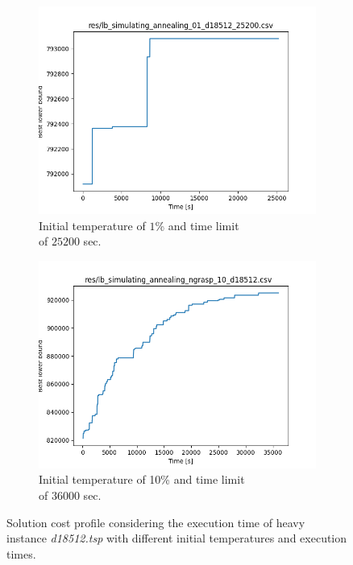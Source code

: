 \begin{figure}[!h]
	\begin{subfigure}{.5\columnwidth}
		\centering
		\includegraphics[width=\columnwidth]{../res/lb_simulating_annealing_n_grasp_01_d18512_25200.png}
		\caption{Initial temperature of $1$\% and time limit \protect\\ of $25200$ sec.}
		\label{fig:sim_ann_1_d18512}
	\end{subfigure}
	\begin{subfigure}{.5\columnwidth}
		\centering
		\includegraphics[width=\columnwidth]{../res/lb_simulating_annealing_ngrasp_10_d18512_36000.png}
		\caption{Initial temperature of 10\% and time limit \protect\\ of $36000$ sec.}
		\label{fig:sim_ann_10_d18512}
	\end{subfigure}
	\caption{Solution cost profile considering the execution time of heavy instance \textit{d18512.tsp} with different initial temperatures and execution times.}
	\label{fig:sim_ann_heavy}
\end{figure}
